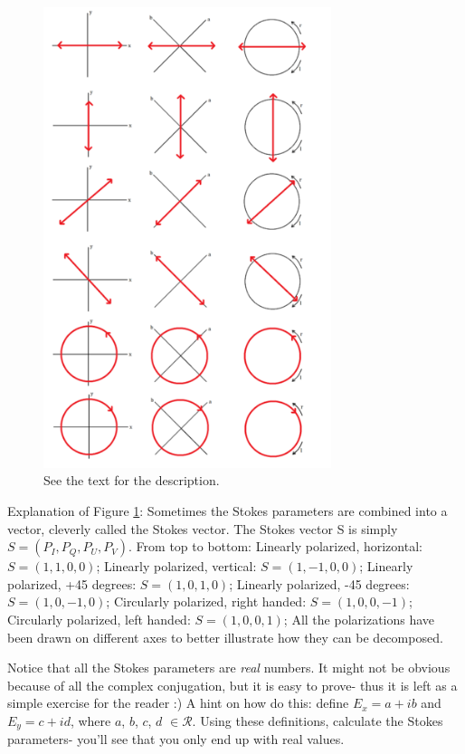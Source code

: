 \documentclass{article}
\begin{document}
\begin{figure}
    \centering
    \includegraphics[width=0.75\textwidth]{figures/375px-Stokes1.png}
    \caption{See the text for the description.}
    \label{fig:stokes}
\end{figure}

Explanation of Figure \ref{fig:stokes}: Sometimes the Stokes parameters are combined into a vector, cleverly called the Stokes vector. The Stokes vector S is simply $S = (P_I, P_Q, P_U, P_V)$. From top to bottom: Linearly polarized, horizontal: $S = (1,1,0,0)$; Linearly polarized, vertical: $S = (1,-1,0,0)$; Linearly polarized, +45 degrees: $S = (1,0,1,0)$; Linearly polarized, -45 degrees: $S = (1,0,-1,0)$; Circularly polarized, right handed: $S = (1,0,0,-1)$; Circularly polarized, left handed: $S = (1,0,0,1)$; All the polarizations have been drawn on different axes to better illustrate how they can be decomposed.

Notice that all the Stokes parameters are \emph{real} numbers. It might not be obvious because of all the complex conjugation, but it is easy to prove- thus it is left as a simple exercise for the reader :) A hint on how do this: define $E_x = a + ib$ and $E_y = c + id$, where $a$, $b$, $c$, $d$ $\in \mathcal{R}$. Using these definitions, calculate the Stokes parameters- you'll see that you only end up with real values.
\end{document}
